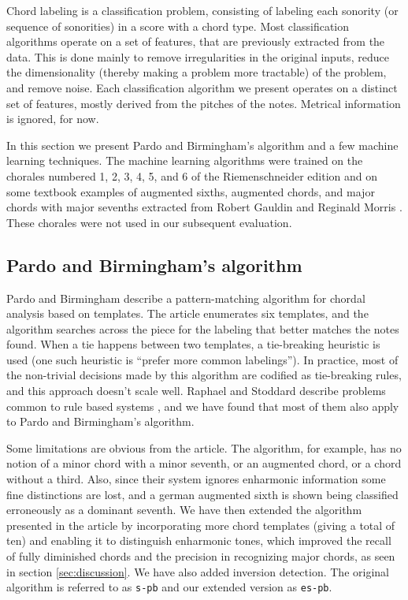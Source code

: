 \documentclass{article}
\begin{document}
Chord labeling is a classification problem, consisting of labeling
each sonority (or sequence of sonorities) in a score with a chord
type. Most classification algorithms operate on a set of features,
that are previously extracted from the data. This is done mainly to
remove irregularities in the original inputs, reduce the
dimensionality (thereby making a problem more tractable) of the
problem, and remove noise. Each classification algorithm we present
operates on a distinct set of features, mostly derived from the
pitches of the notes. Metrical information is ignored, for now.

In this section we present Pardo and Birmingham's algorithm and a few
machine learning techniques. The machine learning algorithms were
trained on the chorales numbered 1, 2, 3, 4, 5, and 6 of the
Riemenschneider edition and on some textbook examples of augmented
sixths, augmented chords, and major chords with major sevenths extracted
from Robert Gauldin \cite{gauldin:harmonic} and Reginald Morris
\cite{morris:figured}. These chorales were not used in our subsequent
evaluation.

\subsection{Pardo and Birmingham's algorithm}
\label{sec:pardo}


Pardo and Birmingham \cite{pardo.ea:algorithms} describe a
pattern-matching algorithm for chordal analysis based on templates.
The article enumerates six templates, and the algorithm searches
across the piece for the labeling that better matches the notes found.
When a tie happens between two templates, a tie-breaking heuristic is
used (one such heuristic is ``prefer more common labelings''). In
practice, most of the non-trivial decisions made by this algorithm are
codified as tie-breaking rules, and this approach doesn't scale
well. Raphael and Stoddard describe problems common to rule based
systems \cite{raphael.ea:harmonic}, and we have found that most of
them also apply to Pardo and Birmingham's algorithm.

Some limitations are obvious from the article. The algorithm, for
example, has no notion of a minor chord with a minor seventh, or an
augmented chord, or a chord without a third. Also, since their system
ignores enharmonic information some fine distinctions are lost, and a
german augmented sixth is shown being classified erroneously as a
dominant seventh. We have then extended the algorithm presented in the
article by incorporating more chord templates (giving a total of ten)
and enabling it to distinguish enharmonic tones, which improved the
recall of fully diminished chords and the precision in recognizing
major chords, as seen in section \ref{sec:discussion}. We have also
added inversion detection. The original algorithm is referred to as
\texttt{s-pb} and our extended version as \texttt{es-pb}.
\end{document}

